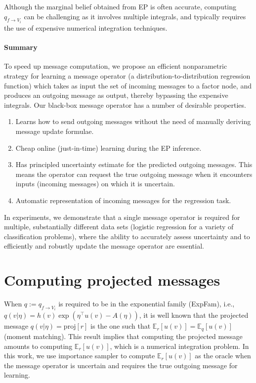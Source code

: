 \documentclass[a4paper,10pt]{article}
\begin{document}
Although the marginal belief obtained from EP is often accurate, computing
$q_{f \rightarrow V_i}$ can be challenging as it involves multiple integrals, and 
typically requires the use of expensive numerical integration techniques.


\paragraph{Summary}

To speed up message computation, we propose an
efficient nonparametric strategy for learning a message operator (a
distribution-to-distribution regression function)
which takes as input the set of incoming messages to a factor node, and produces an 
outgoing message as output, thereby bypassing the expensive integrals. 
Our black-box message operator has a number of desirable properties.

\begin{enumerate}
    \item Learns how to send outgoing messages without the need of manually
        deriving message update formulae.
    \item Cheap online (just-in-time) learning during the EP inference.
    \item Has principled uncertainty estimate for the predicted outgoing
    messages.  This means the operator can request the true outgoing message
when it encounters inputs (incoming messages) on which it is uncertain.  
    \item Automatic representation of incoming messages for the regression task.
\end{enumerate}

In experiments, we demonstrate that a single message operator is required for
multiple, substantially different data sets (logistic regression for a variety
of classification problems), where the ability to accurately assess uncertainty
and to efficiently and robustly update the message operator are essential.

\section{Computing projected messages}
When $q := q_{f \rightarrow V_i}$ is  required to be in the exponential family
(ExpFam), i.e., $q(v|\eta) = h(v)\exp(\eta^\top u(v) - A(\eta))$, 
it is well known that the projected message $q(v|\eta) = \mathrm{proj}[r]$ is
the one such that $\mathbb{E}_r[u(v)] = \mathbb{E}_q[u(v)]$ (moment matching).
This result implies that computing the projected message amounts to computing
$\mathbb{E}_r[u(v)]$, which is a numerical integration problem. In this work,
we use importance sampler to compute $\mathbb{E}_r[u(v)]$ as the oracle when 
the message operator is uncertain and requires the true outgoing message for 
learning. 
\end{document}
